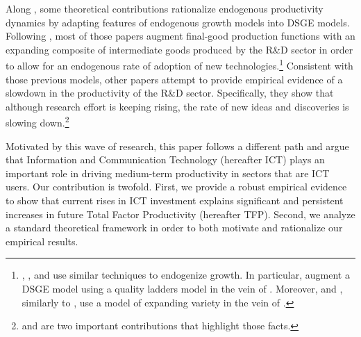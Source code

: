 \documentclass[14pt]{article}
\begin{document}
Along \cite{comin2006medium}, some theoretical contributions rationalize endogenous productivity dynamics by adapting features of endogenous growth models into DSGE models. Following \cite{romer1990endogenous}, most of those papers augment final-good production functions with an expanding composite of intermediate goods produced by the R\&D sector in order to allow for an endogenous rate of adoption of new technologies.\footnote{\cite{bianchi2014growth}, \cite{anzoategui2016endogenous}, and \cite{moran2017innovation} use similar techniques to endogenize growth. In particular, \cite{bianchi2014growth} augment a DSGE  model using a quality ladders model in the vein of \cite{grossman1991quality}. Moreover, \cite{anzoategui2016endogenous} and \cite{moran2017innovation}, similarly to \cite{comin2006medium}, use a model of expanding variety in the vein of \cite{romer1990endogenous}.} Consistent with those previous models, other papers attempt to provide empirical evidence of a slowdown in the productivity of the R\&D sector. Specifically, they show that although research effort is keeping rising, the rate of new ideas and discoveries is slowing down.\footnote{\cite{jones2009burden} and \cite{bloom2017ideas} are two important contributions that highlight those facts.}

Motivated by this wave of research, this paper follows a different path and argue that Information and Communication Technology (hereafter ICT) plays an important role in driving medium-term productivity in sectors that are ICT users. Our contribution is twofold. First, we provide a robust empirical evidence to show that current rises in ICT investment explains significant and persistent increases in future Total Factor Productivity (hereafter TFP). Second, we analyze a standard theoretical framework in order to both motivate and rationalize our empirical results. 
\end{document}
